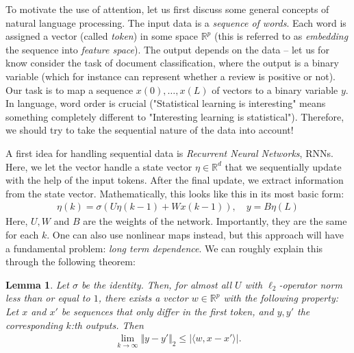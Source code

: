 \documentclass{article}
\newcommand{\sprod}[1]{\langle #1 \rangle}
\newcommand{\R}{\mathbb{R}}
\newtheorem{lemma}{Lemma}
\newcommand{\abs}[1]{\vert #1 \vert}
\newcommand{\norm}[1]{\Vert #1 \Vert}
\begin{document}
To motivate the use of attention, let us first discuss some general concepts of natural language processing. The input data is a \emph{sequence of words}. Each word is assigned a vector (called \emph{token}) in some space $\R^p$ (this is referred to as \emph{embedding} the sequence into \emph{feature space}). The output depends on the data -- let us for know consider the task of document classification, where the output is a binary variable (which for instance can represent whether a review is positive or not). Our task is to map a sequence $x(0), \dots, x(L)$ of vectors to a binary variable $y$. In language, word order is crucial ("Statistical learning is interesting" means something completely different to "Interesting learning is statistical"). Therefore, we should try to take the sequential nature of the data into account!

A first idea for handling sequential data is \emph{Recurrent Neural Networks}, RNNs. Here, we let the vector handle a state vector $\eta \in \R^d$ that we sequentially update with the help of the input tokens. After the final update, we extract information from the state vector. Mathematically, this looks like this in its most basic form:
\begin{align*}
    \eta(k) = \sigma(U\eta(k-1) + Wx(k-1)), \quad y = B\eta(L)
\end{align*}
Here, $U,W$ and $B$ are the weights of the network. Importantly, they are the same for each $k$. One can also use nonlinear maps instead, but this approach will have a fundamental problem: \emph{long term dependence}. We can roughly explain this through the following theorem:
\begin{lemma}
    Let $\sigma$ be the identity. Then, for almost all $U$ with $\ell_2$-operator norm less than or equal to $1$, there exists a vector $w\in \R^p$ with the following property: Let $x$ and $x'$ be sequences that only differ in the first token, and $y, y'$ the corresponding $k$:th outputs. Then
    \begin{align*}
        \lim_{k\to \infty} \norm{y - y'}_2 \leq \abs{\sprod{w,x-x'}}.
    \end{align*}
\end{lemma}
\end{document}
